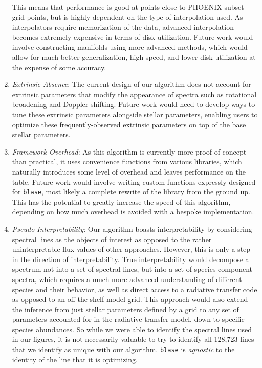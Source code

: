 \documentclass[twocolumn, linenumbers]{aastex631}
\begin{document}
\begin{enumerate}[label=-]
    This means that performance is good at points close to PHOENIX subset grid points, but is highly dependent on the type of interpolation used.
    As interpolators require memorization of the data, advanced interpolation becomes extremely expensive in terms of disk utilization.
    Future work would involve constructing manifolds using more advanced methods, which would allow for much better generalization, high speed, and lower disk utilization at the expense of some accuracy.
    \item \textit{Extrinsic Absence}: The current design of our algorithm does not account for extrinsic parameters that modify the appearance of spectra such as rotational broadening and Doppler shifting.
    Future work would need to develop ways to tune these extrinsic parameters alongside stellar parameters, enabling users to optimize these frequently-observed extrinsic parameters on top of the base stellar parameters.
    \item \textit{Framework Overhead}: As this algorithm is currently more proof of concept than practical, it uses convenience functions from various libraries, which naturally introduces some level of overhead and leaves performance on the table.
    Future work would involve writing custom functions expressly designed for \texttt{blase}, most likely a complete rewrite of the library from the ground up.
    This has the potential to greatly increase the speed of this algorithm, depending on how much overhead is avoided with a bespoke implementation.
    \item \textit{Pseudo-Interpretability}: Our algorithm boasts interpretability by considering spectral lines as the objects of interest as opposed to the rather uninterpretable flux values of other approaches.
    However, this is only a step in the direction of interpretability.
    True interpretability would decompose a spectrum not into a set of spectral lines, but into a set of species component spectra, which requires a much more advanced understanding of different species and their behavior, as well as direct access to a radiative transfer code as opposed to an off-the-shelf model grid.
    This approach would also extend the inference from just stellar parameters defined by a grid to any set of parameters accounted for in the radiative transfer model, down to specific species abundances.
    So while we were able to identify the spectral lines used in our figures, it is not necessarily valuable to try to identify all 128,723 lines that we identify as unique with our algorithm.
    \texttt{blase} is \textit{agnostic} to the identity of the line that it is optimizing.

\end{enumerate}
\end{document}

